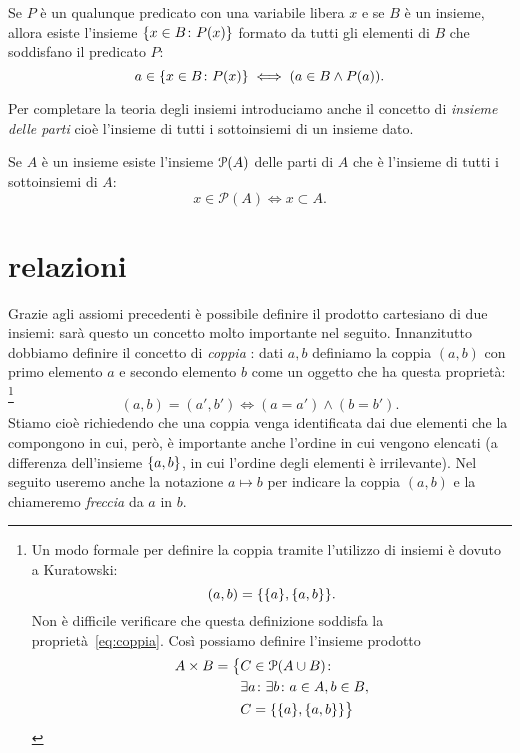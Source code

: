 \begin{axiom}[specificazione]
  Se $P$ è un qualunque predicato con una variabile libera $x$
  e se $B$ è un insieme, allora esiste l'insieme 
  $\ENCLOSE {x\in B\colon P(x)}$ formato 
  da tutti gli elementi di $B$ che soddisfano il predicato $P$:
\[
  a \in \ENCLOSE{x\in B\colon P(x)} \iff (a \in B \land P(a)).
\]
\end{axiom}

Per completare la teoria degli insiemi introduciamo anche il concetto di
\emph{insieme delle parti}%
%
% 
cioè l'insieme di tutti i sottoinsiemi di un insieme dato.
\begin{axiom}
\label{def:insieme_parti}%
Se $A$ è un insieme esiste l'insieme $\P(A)$ delle parti di $A$
che è l'insieme di tutti i sottoinsiemi di $A$:
\begin{equation}\label{eq:insieme_delle_parti}
  x \in \mathcal P(A) \iff x \subset A.
\end{equation}
\end{axiom}

\section{relazioni}

Grazie agli assiomi precedenti è possibile definire il prodotto cartesiano
di due insiemi: sarà questo un concetto molto importante nel seguito.
Innanzitutto dobbiamo definire il concetto di \emph{coppia}%
%
: dati
$a,b$ definiamo la coppia $(a,b)$ con primo elemento $a$ e secondo elemento $b$
come un oggetto che ha questa proprietà:%
\footnote{%
Un modo formale per definire la coppia tramite l'utilizzo di insiemi 
è dovuto a Kuratowski:
\[
   (a,b) = \ENCLOSE{\ENCLOSE{a},\ENCLOSE{a,b}}.
\]
Non è difficile verificare che questa definizione soddisfa la 
proprietà~\eqref{eq:coppia}.
Così possiamo definire l'insieme prodotto
\begin{align*}
  A\times B = \big\{&C\in \mathcal P(A\cup B)\colon \\ 
  & \exists a\colon \exists b\colon a\in A, b\in B, \\
  & C=\ENCLOSE{\ENCLOSE{a},\ENCLOSE{a,b}}\big\}
\end{align*}
}%
\begin{equation}\label{eq:coppia}
  (a, b) = (a', b') \iff (a=a') \land (b=b').
\end{equation}
Stiamo cioè richiedendo che una coppia venga identificata dai due
elementi che la compongono in cui, però, è importante anche l'ordine in
cui vengono elencati (a differenza dell'insieme $\ENCLOSE{a,b}$, in cui
l'ordine degli elementi è irrilevante).
Nel seguito useremo anche la notazione $a \mapsto b$ per indicare 
la coppia $(a,b)$ e la chiameremo \emph{freccia}%
%
 da $a$ in $b$.

